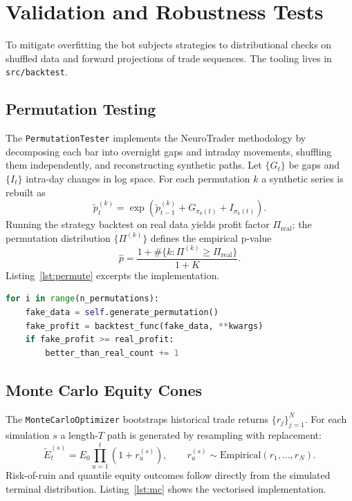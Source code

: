 \chapter{Validation and Robustness Tests}

To mitigate overfitting the bot subjects strategies to distributional checks on shuffled data and forward projections of trade sequences. The tooling lives in \texttt{src/backtest}.

\section{Permutation Testing}
The \texttt{PermutationTester} implements the NeuroTrader methodology by decomposing each bar into overnight gaps and intraday movements, shuffling them independently, and reconstructing synthetic paths. Let $\{G_t\}$ be gaps and $\{I_t\}$ intra-day changes in log space. For each permutation $k$ a synthetic series is rebuilt as
\begin{equation}
\tilde{p}^{(k)}_t = \exp\!\left(\tilde{p}^{(k)}_{t-1} + G_{\pi_k(t)} + I_{\sigma_k(t)}\right).
\end{equation}
Running the strategy backtest on real data yields profit factor $\Pi_{\text{real}}$; the permutation distribution $\{\Pi^{(k)}\}$ defines the empirical p-value
\begin{equation}
\hat{p} = \frac{1 + \#\{k : \Pi^{(k)} \geq \Pi_{\text{real}}\}}{1 + K}.
\end{equation}
Listing~\ref{lst:permute} excerpts the implementation.

\begin{lstlisting}[language=Python,firstnumber=56,label={lst:permute},caption={Permutation loop excerpt}]
for i in range(n_permutations):
    fake_data = self.generate_permutation()
    fake_profit = backtest_func(fake_data, **kwargs)
    if fake_profit >= real_profit:
        better_than_real_count += 1
\end{lstlisting}

\section{Monte Carlo Equity Cones}
The \texttt{MonteCarloOptimizer} bootstraps historical trade returns $\{r_j\}_{j=1}^N$. For each simulation $s$ a length-$T$ path is generated by resampling with replacement:
\begin{equation}
\tilde{E}^{(s)}_t = E_0 \prod_{u=1}^{t} (1 + r^{(s)}_u), \qquad r^{(s)}_u \sim \text{Empirical}(r_1,\dots,r_N).
\end{equation}
Risk-of-ruin and quantile equity outcomes follow directly from the simulated terminal distribution. Listing~\ref{lst:mc} shows the vectorised implementation.

